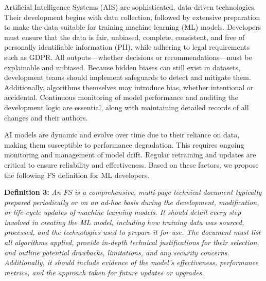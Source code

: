\documentclass[manuscript,screen,review]{acmart}
\begin{document}
	Artificial Intelligence Systems (AIS) are sophisticated, data-driven technologies. Their development begins with data collection, followed by extensive preparation to make the data suitable for training machine learning (ML) models. Developers must ensure that the data is fair, unbiased, complete, consistent, and free of personally identifiable information (PII), while adhering to legal requirements such as GDPR. All outputs—whether decisions or recommendations—must be explainable and unbiased. Because hidden biases can still exist in datasets, development teams should implement safeguards to detect and mitigate them. Additionally, algorithms themselves may introduce bias, whether intentional or accidental. Continuous monitoring of model performance and auditing the development logic are essential, along with maintaining detailed records of all changes and their authors.
	
	AI models are dynamic and evolve over time due to their reliance on data, making them susceptible to performance degradation. This requires ongoing monitoring and management of model drift. Regular retraining and updates are critical to ensure reliability and effectiveness. Based on these factors, we propose the following FS definition for ML developers.
	
	
	
	\textbf{Definition 3: }\textit{An FS is a comprehensive, multi-page technical document typically prepared periodically or on an ad-hoc basis during the development, modification, or life-cycle updates of machine learning models. It should detail every step involved in creating the ML model, including how training data was sourced, processed, and the technologies used to prepare it for use. The document must list all algorithms applied, provide in-depth technical justifications for their selection, and outline potential drawbacks, limitations, and any security concerns. Additionally, it should include evidence of the model’s effectiveness, performance metrics, and the approach taken for future updates or upgrades.}

\end{document}
